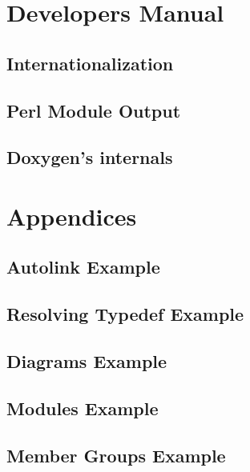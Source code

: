 \documentclass{book}
\newcommand{\+}{\discretionary{\mbox{\scriptsize$\hookleftarrow$}}{}{}}
\begin{document}
\part{Developers Manual}
\chapter{Internationalization}\label{langhowto}\hypertarget{langhowto}{}
\chapter{Perl Module Output}\label{perlmod}\hypertarget{perlmod}{}
\chapter{Doxygen's internals}\label{arch}\hypertarget{arch}{}
\renewcommand{\thepart}{}
\part{Appendices}
\appendix
\chapter{Autolink Example}\label{autolink_example}\hypertarget{autolink_example}{}
\chapter{Resolving Typedef Example}\label{restypedef_example}\hypertarget{restypedef_example}{}

{
  \chapter{Diagrams Example}\label{diagrams_example}\hypertarget{diagrams_example}{}
}{}

\chapter{Modules Example}\label{modules_example}\hypertarget{modules_example}{}
\chapter{Member Groups Example}\label{memgrp_example}\hypertarget{memgrp_example}{}
\end{document}
